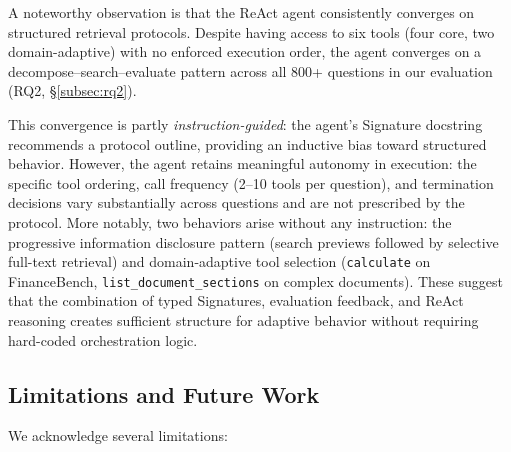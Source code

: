 A noteworthy observation is that the ReAct agent consistently converges on structured retrieval protocols.
Despite having access to six tools (four core, two domain-adaptive) with no enforced execution order, the agent converges on a decompose--search--evaluate pattern across all 800+ questions in our evaluation (RQ2, \S\ref{subsec:rq2}).

This convergence is partly \emph{instruction-guided}: the agent's Signature docstring recommends a protocol outline, providing an inductive bias toward structured behavior.
However, the agent retains meaningful autonomy in execution: the specific tool ordering, call frequency (2--10 tools per question), and termination decisions vary substantially across questions and are not prescribed by the protocol.
More notably, two behaviors arise without any instruction: the progressive information disclosure pattern (search previews followed by selective full-text retrieval) and domain-adaptive tool selection (\texttt{calculate} on FinanceBench, \texttt{list\_document\_sections} on complex documents).
These suggest that the combination of typed Signatures, evaluation feedback, and ReAct reasoning creates sufficient structure for adaptive behavior without requiring hard-coded orchestration logic.

\subsection{Limitations and Future Work}
\label{subsec:limitations}

We acknowledge several limitations:

